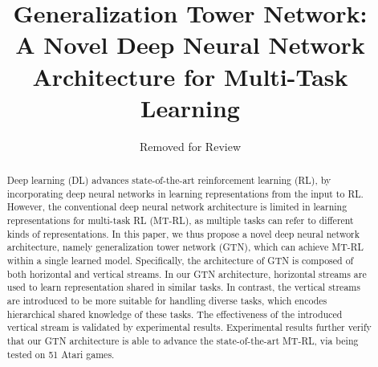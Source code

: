\documentclass[letterpaper]{article} %
\begin{document}
%


\newcommand{\argmin}{\operatornamewithlimits{argmin}}
\newcommand{\argmax}{\operatornamewithlimits{argmax}}

\newcommand{\tabincell}[2]{\begin{tabular}{@{}#1@{}}#2\end{tabular}}

\newtheorem{theorem}{$\textbf{Theorem}$}
\newtheorem{lemma}[theorem]{$\textbf{Lemma}$}

\def\abovestrut#1{\rule[0in]{0in}{#1}\ignorespaces}
\def\belowstrut#1{\rule[-#1]{0in}{#1}\ignorespaces}
\def\abovespace{\abovestrut{0.01in}}
\def\belowspace{\belowstrut{-0.01in}}

\title{Generalization Tower Network: \\
A Novel Deep Neural Network Architecture for Multi-Task Learning}
\author{Removed for Review}
\maketitle
\begin{abstract}
Deep learning (DL) advances state-of-the-art reinforcement learning (RL), by incorporating deep neural networks in learning representations from the input to RL. However, the conventional deep neural network architecture is limited in learning representations for multi-task RL (MT-RL), as multiple tasks can refer to different kinds of representations. In this paper, we thus propose a novel deep neural network architecture, namely generalization tower network (GTN), which can achieve MT-RL within a single learned model. Specifically, the architecture of GTN is composed of both horizontal and vertical streams. In our GTN architecture, horizontal streams are used to learn representation shared in similar tasks. In contrast, the vertical streams are introduced to be more suitable for handling diverse tasks, which encodes hierarchical shared knowledge of these tasks. The effectiveness of the introduced vertical stream is validated by experimental results. Experimental results further verify that our GTN architecture is able to advance the state-of-the-art MT-RL, via being tested on 51 Atari games.
\end{abstract}
\end{document}
